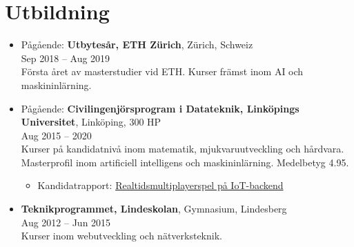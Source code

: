 \documentclass[12pt]{article}
\newcommand{\text}[2]{#2}
\newcommand{\text}[2]{#1}
\begin{document}
\section*{\text{Education}{Utbildning}}
\begin{itemize}
    \item \text{
            In progress: \textbf{Exchange Year, ETH Zürich}, Zürich, Switzerland\\
        }{
            Pågående: \textbf{Utbytesår, ETH Zürich}, Zürich, Schweiz\\
        }
        Sep 2018 -- Aug 2019\\
        \text{
            First year of my master as an exchange student at ETH. Courses mainly in AI and machine learning.
        }{
            Första året av masterstudier vid ETH. Kurser främst inom AI och maskininlärning.
        }

    \item \text{
            In progress: \textbf{Master programme in Computer Science and Engineering (Swedish Civilingenjörsprogram), Linköping University}, Linköping, 300 ECTS\\
        }{
            Pågående: \textbf{Civilingenjörsprogram i Datateknik, Linköpings Universitet}, Linköping, 300 HP\\
        }
        Aug 2015 -- 2020\\
        \text{
            Bachelor courses in mathematics, software development and hardware. Master focused on artificial intelligence and machine learning.
        }{
            Kurser på kandidatnivå inom matematik, mjukvaruutveckling och hårdvara. Masterprofil inom artificiell intelligens och maskininlärning. Medelbetyg 4.95.
        }
        \begin{itemize}
            \item \text{
                    Bachelor thesis: \href{http://urn.kb.se/resolve?urn=urn:nbn:se:liu:diva-149042}{Real-time Multiplayer Game on IoT-backend}
                }{
                    Kandidatrapport: \href{http://urn.kb.se/resolve?urn=urn:nbn:se:liu:diva-149042}{Realtidsmultiplayerspel på IoT-backend}
                }
        \end{itemize}

    \item \text{
            \textbf{Technology Program, Lindeskolan}, Upper secondary school, Lindesberg\\
        }{
            \textbf{Teknikprogrammet, Lindeskolan}, Gymnasium, Lindesberg\\
        }
        Aug 2012 -- Jun 2015\\
        \text{
            Courses in web development and network technologies.
        }{
            Kurser inom webutveckling och nätverksteknik.
        }

\end{itemize}
\end{document}
